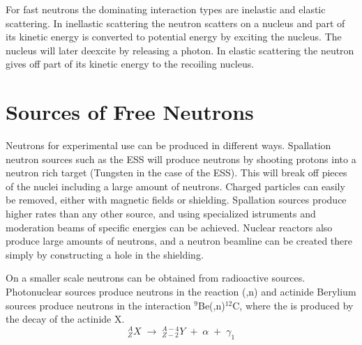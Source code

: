 \documentclass[main.tex]{subfiles}
\begin{document}
For fast neutrons the dominating interaction types are inelastic and elastic scattering. In inellastic scattering the neutron scatters on a nucleus and part of its kinetic energy is converted to potential energy by exciting the nucleus. The nucleus will later deexcite by releasing a photon. In elastic scattering the neutron gives off part of its kinetic energy to the recoiling nucleus\cite[pg.63]{LEo}.



\section{Sources of Free Neutrons}
Neutrons for experimental use can be produced in different ways. Spallation neutron sources such as the ESS will produce neutrons by shooting protons into a neutron rich target (Tungsten in the case of the ESS). This will break off pieces of the nuclei including a large amount of neutrons. Charged particles can easily be removed, either with magnetic fields or shielding. Spallation sources produce higher rates than any other source, and using specialized istruments and moderation beams of specific energies can be achieved. Nuclear reactors also produce large amounts of neutrons, and a neutron beamline can be created there simply by constructing a hole in the shielding\cite[446]{Krane}. 

On a smaller scale neutrons can be obtained from radioactive sources. Photonuclear sources produce neutrons in the reaction (\textgamma ,n) and actinide Berylium sources produce neutrons in the interaction $^\text{9}$Be(\textalpha,n)$^\text{12}$C, where the \textalpha\;is produced by the decay of the actinide X\cite[pg.8]{Leo}.
\begin{equation}
	^A_ZX\;\rightarrow\;^{A-4}_{Z-2}Y\;+\;\alpha\;+\;\gamma_1
	\label{eq:actinide}
\end{equation}
\end{document}
